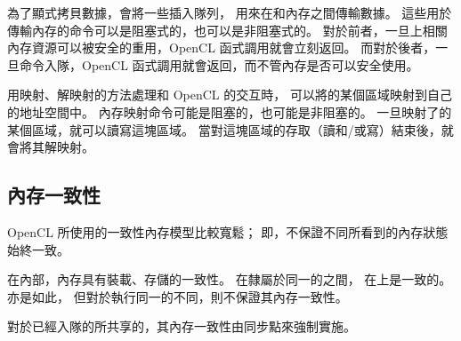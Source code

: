 為了顯式拷貝數據，會將一些插入隊列，
用來在和內存之間傳輸數據。
這些用於傳輸內存的命令可以是阻塞式的，也可以是非阻塞式的。
對於前者，一旦上相關內存資源可以被安全的重用，OpenCL 函式調用就會立刻返回。
而對於後者，一旦命令入隊，OpenCL 函式調用就會返回，而不管內存是否可以安全使用。

用映射、解映射的方法處理和 OpenCL 的交互時，
可以將的某個區域映射到自己的地址空間中。
內存映射命令可能是阻塞的，也可能是非阻塞的。
一旦映射了的某個區域，就可以讀寫這塊區域。
當對這塊區域的存取（讀和/或寫）結束後，就會將其解映射。

\subsection{內存一致性}
OpenCL 所使用的一致性內存模型比較寬鬆；
即，不保證不同所看到的內存狀態始終一致。

在內部，內存具有裝載、存儲的一致性。
在隸屬於同一的之間，
在上是一致的。
亦是如此，
但對於執行同一的不同，則不保證其內存一致性。

對於已經入隊的所共享的，其內存一致性由同步點來強制實施。

